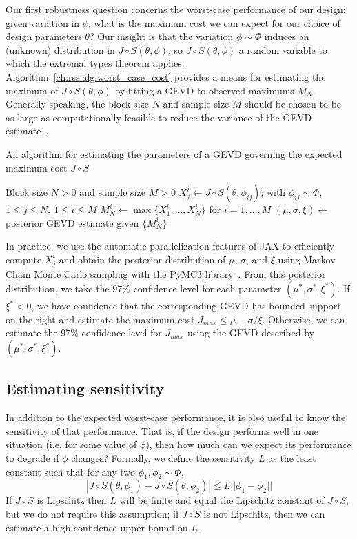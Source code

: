 Our first robustness question concerns the worst-case performance of our design: given variation in $\phi$, what is the maximum cost we can expect for our choice of design parameters $\theta$? Our insight is that the variation $\phi \sim \Phi$ induces an (unknown) distribution in $J \circ S (\theta, \phi)$, so $J \circ S (\theta, \phi)$ a random variable to which the extremal types theorem applies. Algorithm~\ref{ch:rss:alg:worst_case_cost} provides a means for estimating the maximum of $J \circ S (\theta, \phi)$ by fitting a GEVD to observed maximums $M_N$. Generally speaking, the block size $N$ and sample size $M$ should be chosen to be as large as computationally feasible to reduce the variance of the GEVD estimate~\cite{coles_2001}.

\begin{algorithm}
    \caption{An algorithm for estimating the parameters of a GEVD governing the expected maximum cost $J \circ S$}\label{ch:rss:alg:worst_case_cost}
    \begin{algorithmic}
        \Require Block size $N > 0$ and sample size $M > 0$
        \State $X_j^i \gets J\circ S(\theta, \phi_{ij})$; with $\phi_{ij}\sim\Phi$, $1\leq j\leq N$, $1\leq i\leq M$
        \State $M_N^i \gets \max\{X_1^i, \ldots, X_N^i\}$ for $i=1,\ldots,M$
        \State $(\mu, \sigma, \xi) \gets$ posterior GEVD estimate given $\{M_N^i\}$
    \end{algorithmic}
\end{algorithm}

In practice, we use the automatic parallelization features of JAX to efficiently compute $X_j^i$ and obtain the posterior distribution of $\mu$, $\sigma$, and $\xi$ using Markov Chain Monte Carlo sampling with the PyMC3 library~\cite{salvatier_wiecki_fonnesbeck_2016}. From this posterior distribution, we take the $97\%$ confidence level for each parameter $(\mu^*, \sigma^*, \xi^*)$. If $\xi^* < 0$, we have confidence that the corresponding GEVD has bounded support on the right and estimate the maximum cost $J_{max} \leq \mu - \sigma/\xi$. Otherwise, we can estimate the 97\% confidence level for $J_{max}$ using the GEVD described by $(\mu^*, \sigma^*, \xi^*)$.

\subsection{Estimating sensitivity}

In addition to the expected worst-case performance, it is also useful to know the sensitivity of that performance. That is, if the design performs well in one situation (i.e. for some value of $\phi$), then how much can we expect its performance to degrade if $\phi$ changes? Formally, we define the sensitivity $L$ as the least constant such that for any two $\phi_1, \phi_2 \sim \Phi$, $$|J\circ S(\theta, \phi_1) - J\circ S(\theta, \phi_2)| \leq L ||\phi_1 - \phi_2||$$
If $J \circ S$ is Lipschitz then $L$ will be finite and equal the Lipschitz constant of $J \circ S$, but we do not require this assumption; if $J \circ S$ is not Lipschitz, then we can estimate a high-confidence upper bound on $L$.

